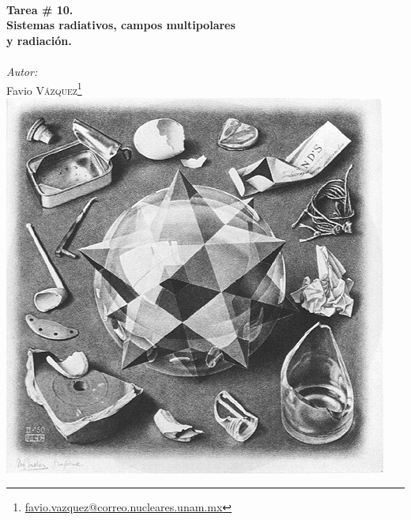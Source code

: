 \documentclass[a4paper,11pt]{article}
\numberwithin{equation}{section}
\begin{document}
\begin{titlepage}

\HRule \\[0.1cm]
{ \huge \bfseries Tarea \# 10. \\ Sistemas radiativos, campos multipolares \\
y radiación.}\\ %
\HRule \\[0.1cm]
 
\setcounter{footnote}{0}
\center
\large
\emph{Autor:} \\ %
\Large Favio \textsc{Vázquez}\footnote[1]{\href{mailto:favio.vazquez@correo.nucleares.unam.mx}{favio.vazquez@correo.nucleares.unam.mx}}
\\[0.7cm]

\includegraphics[scale=0.6]{escherDodecaedro}


\vfill %

\end{titlepage}
\end{document}

